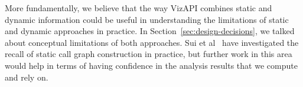 More fundamentally, we believe that the way VizAPI combines static and
dynamic information could be useful in understanding the limitations
of static and dynamic approaches in practice. In
Section~\ref{sec:design-decisions}, we talked about conceptual
limitations of both approaches. Sui et
al~\cite{sui20:_recal_static_call_graph_const_pract} have investigated
the recall of static call graph construction in practice, but further
work in this area would help in terms of having confidence in the
analysis results that we compute and rely on.

